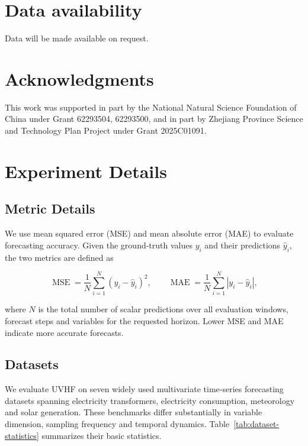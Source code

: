 \documentclass[final,3p,times]{elsarticle}
\begin{document}
\section*{Data availability}
Data will be made available on request.

\section*{Acknowledgments}
This work was supported in part by the National Natural Science Foundation of China under Grant 62293504, 62293500, and in part by Zhejiang Province Science and Technology Plan Project under Grant 2025C01091.

\appendix
\renewcommand*{\theHtable}{appendix.\Alph{section}.\arabic{table}}
\renewcommand*{\theHfigure}{appendix.\Alph{section}.\arabic{figure}}

\setcounter{table}{0}
\setcounter{figure}{0}
\section{Experiment Details}
\label{app:experiment-details}


\subsection{Metric Details}


We use mean squared error (MSE) and mean absolute error (MAE) to evaluate forecasting accuracy. Given the ground-truth values $y_i$ and their predictions $\widehat y_i$, the two metrics are defined as

\begin{equation}
\operatorname{MSE}
=
\frac{1}{N}
\sum_{i=1}^{N}
\left(y_i-\widehat y_i\right)^2,
\qquad
\operatorname{MAE}
=
\frac{1}{N}
\sum_{i=1}^{N}
\left|y_i-\widehat y_i\right|,
\end{equation}


where $N$ is the total number of scalar predictions over all evaluation windows, forecast steps and variables for the requested horizon. Lower MSE and MAE indicate more accurate forecasts.

\subsection{Datasets}


We evaluate UVHF on seven widely used multivariate time-series forecasting datasets spanning electricity transformers, electricity consumption, meteorology and solar generation. These benchmarks differ substantially in variable dimension, sampling frequency and temporal dynamics. Table~\ref{tab:dataset-statistics} summarizes their basic statistics.
\end{document}
